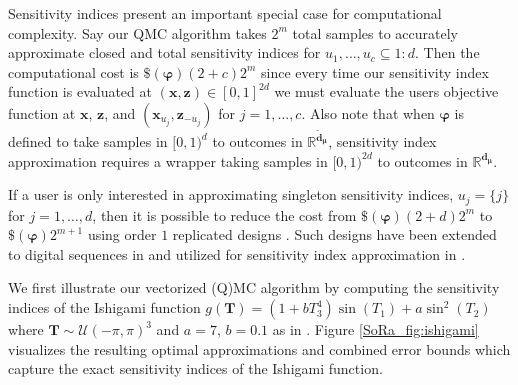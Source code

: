 \documentclass[graybox]{svmult}
\begin{document}
Sensitivity indices present an important special case for computational complexity. Say our QMC algorithm takes $2^m$ total samples to accurately approximate closed and total sensitivity indices for $u_1,\dots,u_c \subseteq 1:d$. Then the computational cost is $\$(\boldsymbol{\varphi})(2+c)2^m$ since every time our sensitivity index function is evaluated at $(\boldsymbol{x},\boldsymbol{z}) \in [0,1]^{2d}$ we must evaluate the users objective function at $\boldsymbol{x}$, $\boldsymbol{z}$, and $(\boldsymbol{x}_{u_j},\boldsymbol{z}_{-{u_j}})$ for $j=1,\dots,c$. Also note that when $\boldsymbol{\varphi}$ is defined to take samples in  $[0,1)^{d}$ to outcomes in $\mathbb{R}^{\tilde{\boldsymbol{d}}_{\boldsymbol{\mu}}}$, sensitivity index approximation requires a wrapper taking samples in $[0,1)^{2d}$ to outcomes in $\mathbb{R}^{\boldsymbol{d}_{\boldsymbol{\mu}}}$.

If a user is only interested in approximating singleton sensitivity indices, $u_j = \{j\}$ for $j=1,\dots,d$, then it is possible to reduce the cost from $\$(\boldsymbol{\varphi})(2+d)2^m$ to $\$(\boldsymbol{\varphi})2^{m+1}$ using order $1$ replicated designs \cite{alex2008comparison,tissot2015randomized}. Such designs have been extended to  digital sequences in \cite{replicated_designs_sobol_seq} and utilized for sensitivity index approximation in \cite{reliable_sobol_indices_approx}.

We first illustrate our vectorized (Q)MC algorithm by computing the sensitivity indices of the  Ishigami function \cite{ishigami1990importance} $g(\boldsymbol{T}) = (1+bT_3^4)\sin(T_1)+a\sin^2(T_2)$ where $\boldsymbol{T} \sim \mathcal{U}(-\pi,\pi)^3$ and $a=7$, $b=0.1$ as in \cite{crestaux2007polynomial,marrel2009calculations}. Figure \ref{SoRa_fig:ishigami} visualizes the resulting optimal approximations and combined error bounds which capture the exact sensitivity indices of the Ishigami function. 
\end{document}
